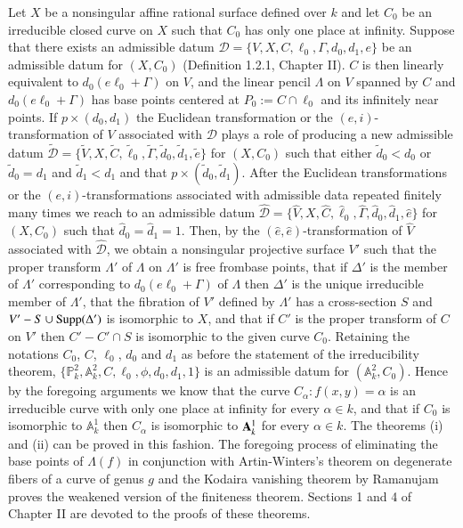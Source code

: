 Let $X$ be a nonsingular affine rational surface defined over $k$ and
let $C_{0}$ be an irreducible closed curve on $X$ such that $C_{0}$
has only one place at infinity. Suppose that there exists an
admissible datum $\mathscr{D}=\{V,X,C,\ell_{0},\Gamma,d_{0},d_{1},e\}$
be an admissible datum for $(X,C_{0})$ (\cf Definition 1.2.1, Chapter
II). $C$ is then linearly equivalent to $d_{0}(e\ell_{0}+\Gamma)$ on
$V$, and the linear pencil $\Lambda$ on $V$ spanned by $C$ and
$d_{0}(e\ell_{0}+\Gamma)$ has base points centered at $P_{0}:=C\cap
\ell_{0}$ and its infinitely near points. If $p\times (d_{0},d_{1})$
the Euclidean transformation or the $(e,i)$-transformation of $V$
associated with $\mathscr{D}$ plays a role of producing a new
admissible datum
$\widetilde{\mathscr{D}}=\{\widetilde{V},X,\widetilde{C},\widetilde{\ell}_{0},\widetilde{\Gamma},\widetilde{d}_{0},\widetilde{d}_{1},\widetilde{e}\}$
for $(X,C_{0})$ such that either $\widetilde{d}_{0}<d_{0}$ or
$\widetilde{d}_{0}=d_{1}$ and $\widetilde{d}_{1}<d_{1}$ and that
$p\times (\widetilde{d}_{0},\widetilde{d}_{1})$. After the Euclidean
transformations or the $(e,i)$-transformations associated with
admissible data repeated finitely many times we reach to an admissible
datum
$\widehat{\mathscr{D}}=\{\widehat{V},X,\widehat{C},\widehat{\ell}_{0},\widehat{\Gamma},\widehat{d}_{0},\widehat{d}_{1},\widehat{e}\}$
for $(X,C_{0})$ such that $\widehat{d}_{0}=\widehat{d}_{1}=1$. Then,
by the $(\widehat{e},\widehat{e})$-transformation of $\widehat{V}$
associated with $\widehat{\mathscr{D}}$, we obtain a nonsingular
projective surface $V'$ such that the proper transform $\Lambda'$ of
$\Lambda$ on $\Lambda'$ is free from\pageoriginale base points, that
if $\Delta'$ is the member of $\Lambda'$ corresponding to
$d_{0}(e\ell_{0}+\Gamma)$ of $\Lambda$ then $\Delta'$ is the unique
irreducible member of $\Lambda'$, that the fibration of $V'$ defined
by $\Lambda'$ has a cross-section $S$ and $V'-S\cup \operatorname{Supp}(\Delta')$ is
isomorphic to $X$, and that if $C'$ is the proper transform of $C$ on
$V'$ then $C'-C'\cap S$ is isomorphic to the given curve
$C_{0}$. Retaining the notations $C_{0}$, $C$, $\ell_{0}$, $d_{0}$ and
$d_{1}$ as before the statement of the irreducibility theorem,
$\{\mathbb{P}^{2}_{k},\mathbb{A}^{2}_{k},
C,\ell_{0},\phi,d_{0},d_{1},1\}$ is an admissible datum for
$(\mathbb{A}^{2}_{k},C_{0})$. Hence by the foregoing arguments we know
that the curve $C_{\alpha}:f(x,y)=\alpha$ is an irreducible curve with
only one place at infinity for every $\alpha\in k$, and that if
$C_{0}$ is isomorphic to $\mathbb{A}^{1}_{k}$ then $C_{\alpha}$ is
isomorphic to $\mathbf{A}^{1}_{k}$ for every $\alpha\in k$. The theorems (i)
and (ii) can be proved in this fashion. The foregoing process of
eliminating the base points of $\Lambda(f)$ in conjunction with
Artin-Winters's theorem \cite{7} on degenerate fibers of a curve of
genus $g$ and the Kodaira vanishing theorem by Ramanujam \cite{46}
proves the weakened version of the finiteness theorem. Sections 1 and
4 of Chapter II are devoted to the proofs of these theorems.

